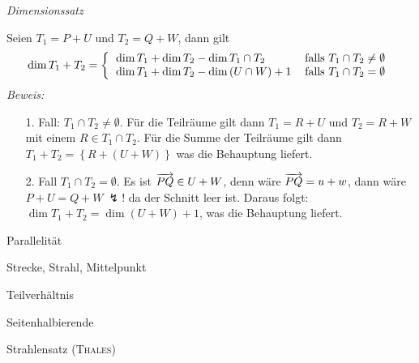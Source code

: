 \begin{mysatz} \textit{Dimensionssatz}\medskip

    Seien $T_1 = P + U$ und $T_2 = Q + W$, dann gilt
    \begin{align*}
        \dim T_1 + T_2 =
        \left\{
        \begin{tabular}{lr}
            $\dim T_1 + \dim T_2 - \dim T_1 \cap T_2$ & falls $T_1 \cap T_2 \neq \emptyset$\\
            $\dim T_1 + \dim T_2 - \dim \left( U \cap W \right) + 1$ & falls $T_1 \cap T_2 = \emptyset$
        \end{tabular}
        \right.
    \end{align*}
    \textit{Beweis:}
    \begin{itemize}
        \item[1. Fall:] $T_1 \cap T_2 \neq \emptyset$.
            Für die Teilräume gilt dann $T_1 = R + U$ und $T_2 = R + W$ mit einem $R \in T_1 \cap T_2$.
            Für die Summe der Teilräume gilt dann $T_1 + T_2 = \left\{ R + \left( U + W \right) \right\}$ was die Behauptung liefert.
        \item[2. Fall] $T_1 \cap T_2 = \emptyset$.
            Es ist $\overrightarrow{PQ} \in U + W$, denn wäre $\overrightarrow{PQ} = u + w$, dann wäre $P + U = Q + W \ \lightning!$ da der Schnitt leer ist.
            Daraus folgt: $\dim T_1 + T_2 = \dim \left( U + W \right) + 1$, was die Behauptung liefert.
    \end{itemize}
\end{mysatz}

\begin{mydef}
    Parallelität
\end{mydef}

\begin{mydef}
    Strecke, Strahl, Mittelpunkt
\end{mydef}

\begin{mydef}
    Teilverhältnis
\end{mydef}

\begin{mysatz}
    Seitenhalbierende
\end{mysatz}

\begin{mysatz}
    Strahlensatz (\textsc{Thales})
\end{mysatz}


